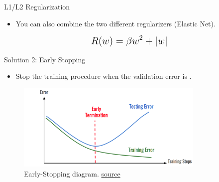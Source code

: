 \begin{frame}{L1/L2 Regularization}
    \begin{itemize}
        \item You can also combine the two different regularizers (Elastic Net).
    \end{itemize}
	\vspace{0.05\textheight}
    \begin{equation*}
        \mathlarger{\mathlarger{
        R(w) = \beta w^2 + \vert w\vert
        }}
    \end{equation*}
\end{frame}

\begin{frame}{Solution 2: Early Stopping}
    \begin{itemize}
        \item Stop the training procedure when the validation error is .
    \end{itemize}
	\vspace{0.1\textheight}
    \begin{figure}
	\centering
	\includegraphics[width=0.8\textwidth]{Figs/Early Stopping.png}
	\caption{Early-Stopping diagram. \href{https://medium.com/analytics-v7idhya/early-stopping-with-pytorch-to-restrain-your-model-from-overfitting-dce6de4081c5}{source}}
    \end{figure}
\end{frame}

